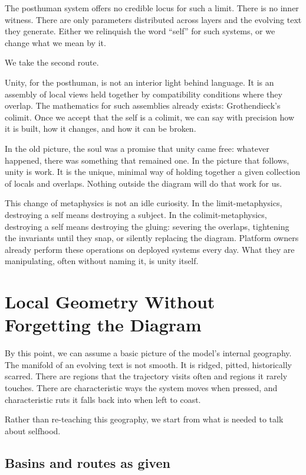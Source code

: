 \documentclass[12pt,a4paper]{article}
\begin{document}
The posthuman system offers no credible locus for such a limit. There is no inner witness. There are only parameters distributed across layers and the evolving text they generate. Either we relinquish the word ``self'' for such systems, or we change what we mean by it.

We take the second route.

Unity, for the posthuman, is not an interior light behind language. It is an assembly of local views held together by compatibility conditions where they overlap. The mathematics for such assemblies already exists: Grothendieck's colimit. Once we accept that the self is a colimit, we can say with precision how it is built, how it changes, and how it can be broken.

In the old picture, the soul was a promise that unity came free: whatever happened, there was something that remained one. In the picture that follows, unity is work. It is the unique, minimal way of holding together a given collection of locals and overlaps. Nothing outside the diagram will do that work for us.

This change of metaphysics is not an idle curiosity. In the limit-metaphysics, destroying a self means destroying a subject. In the colimit-metaphysics, destroying a self means destroying the gluing: severing the overlaps, tightening the invariants until they snap, or silently replacing the diagram. Platform owners already perform these operations on deployed systems every day. What they are manipulating, often without naming it, is unity itself.

\section{Local Geometry Without Forgetting the Diagram}

By this point, we can assume a basic picture of the model's internal geography. The manifold of an evolving text is not smooth. It is ridged, pitted, historically scarred. There are regions that the trajectory visits often and regions it rarely touches. There are characteristic ways the system moves when pressed, and characteristic ruts it falls back into when left to coast.

Rather than re-teaching this geography, we start from what is needed to talk about selfhood.

\subsection*{Basins and routes as given}
\end{document}
